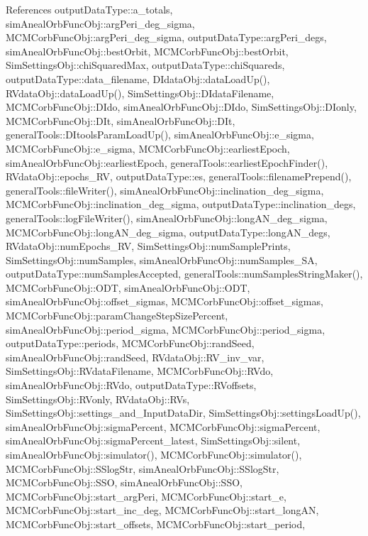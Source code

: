 References output\-Data\-Type\-::a\-\_\-totals, sim\-Aneal\-Orb\-Func\-Obj\-::arg\-Peri\-\_\-deg\-\_\-sigma, M\-C\-M\-Corb\-Func\-Obj\-::arg\-Peri\-\_\-deg\-\_\-sigma, output\-Data\-Type\-::arg\-Peri\-\_\-degs, sim\-Aneal\-Orb\-Func\-Obj\-::best\-Orbit, M\-C\-M\-Corb\-Func\-Obj\-::best\-Orbit, Sim\-Settings\-Obj\-::chi\-Squared\-Max, output\-Data\-Type\-::chi\-Squareds, output\-Data\-Type\-::data\-\_\-filename, D\-Idata\-Obj\-::data\-Load\-Up(), R\-Vdata\-Obj\-::data\-Load\-Up(), Sim\-Settings\-Obj\-::\-D\-Idata\-Filename, M\-C\-M\-Corb\-Func\-Obj\-::\-D\-Ido, sim\-Aneal\-Orb\-Func\-Obj\-::\-D\-Ido, Sim\-Settings\-Obj\-::\-D\-Ionly, M\-C\-M\-Corb\-Func\-Obj\-::\-D\-It, sim\-Aneal\-Orb\-Func\-Obj\-::\-D\-It, general\-Tools\-::\-D\-Itools\-Param\-Load\-Up(), sim\-Aneal\-Orb\-Func\-Obj\-::e\-\_\-sigma, M\-C\-M\-Corb\-Func\-Obj\-::e\-\_\-sigma, M\-C\-M\-Corb\-Func\-Obj\-::earliest\-Epoch, sim\-Aneal\-Orb\-Func\-Obj\-::earliest\-Epoch, general\-Tools\-::earliest\-Epoch\-Finder(), R\-Vdata\-Obj\-::epochs\-\_\-\-R\-V, output\-Data\-Type\-::es, general\-Tools\-::filename\-Prepend(), general\-Tools\-::file\-Writer(), sim\-Aneal\-Orb\-Func\-Obj\-::inclination\-\_\-deg\-\_\-sigma, M\-C\-M\-Corb\-Func\-Obj\-::inclination\-\_\-deg\-\_\-sigma, output\-Data\-Type\-::inclination\-\_\-degs, general\-Tools\-::log\-File\-Writer(), sim\-Aneal\-Orb\-Func\-Obj\-::long\-A\-N\-\_\-deg\-\_\-sigma, M\-C\-M\-Corb\-Func\-Obj\-::long\-A\-N\-\_\-deg\-\_\-sigma, output\-Data\-Type\-::long\-A\-N\-\_\-degs, R\-Vdata\-Obj\-::num\-Epochs\-\_\-\-R\-V, Sim\-Settings\-Obj\-::num\-Sample\-Prints, Sim\-Settings\-Obj\-::num\-Samples, sim\-Aneal\-Orb\-Func\-Obj\-::num\-Samples\-\_\-\-S\-A, output\-Data\-Type\-::num\-Samples\-Accepted, general\-Tools\-::num\-Samples\-String\-Maker(), M\-C\-M\-Corb\-Func\-Obj\-::\-O\-D\-T, sim\-Aneal\-Orb\-Func\-Obj\-::\-O\-D\-T, sim\-Aneal\-Orb\-Func\-Obj\-::offset\-\_\-sigmas, M\-C\-M\-Corb\-Func\-Obj\-::offset\-\_\-sigmas, M\-C\-M\-Corb\-Func\-Obj\-::param\-Change\-Step\-Size\-Percent, sim\-Aneal\-Orb\-Func\-Obj\-::period\-\_\-sigma, M\-C\-M\-Corb\-Func\-Obj\-::period\-\_\-sigma, output\-Data\-Type\-::periods, M\-C\-M\-Corb\-Func\-Obj\-::rand\-Seed, sim\-Aneal\-Orb\-Func\-Obj\-::rand\-Seed, R\-Vdata\-Obj\-::\-R\-V\-\_\-inv\-\_\-var, Sim\-Settings\-Obj\-::\-R\-Vdata\-Filename, M\-C\-M\-Corb\-Func\-Obj\-::\-R\-Vdo, sim\-Aneal\-Orb\-Func\-Obj\-::\-R\-Vdo, output\-Data\-Type\-::\-R\-Voffsets, Sim\-Settings\-Obj\-::\-R\-Vonly, R\-Vdata\-Obj\-::\-R\-Vs, Sim\-Settings\-Obj\-::settings\-\_\-and\-\_\-\-Input\-Data\-Dir, Sim\-Settings\-Obj\-::settings\-Load\-Up(), sim\-Aneal\-Orb\-Func\-Obj\-::sigma\-Percent, M\-C\-M\-Corb\-Func\-Obj\-::sigma\-Percent, sim\-Aneal\-Orb\-Func\-Obj\-::sigma\-Percent\-\_\-latest, Sim\-Settings\-Obj\-::silent, sim\-Aneal\-Orb\-Func\-Obj\-::simulator(), M\-C\-M\-Corb\-Func\-Obj\-::simulator(), M\-C\-M\-Corb\-Func\-Obj\-::\-S\-Slog\-Str, sim\-Aneal\-Orb\-Func\-Obj\-::\-S\-Slog\-Str, M\-C\-M\-Corb\-Func\-Obj\-::\-S\-S\-O, sim\-Aneal\-Orb\-Func\-Obj\-::\-S\-S\-O, M\-C\-M\-Corb\-Func\-Obj\-::start\-\_\-arg\-Peri, M\-C\-M\-Corb\-Func\-Obj\-::start\-\_\-e, M\-C\-M\-Corb\-Func\-Obj\-::start\-\_\-inc\-\_\-deg, M\-C\-M\-Corb\-Func\-Obj\-::start\-\_\-long\-A\-N, M\-C\-M\-Corb\-Func\-Obj\-::start\-\_\-offsets, M\-C\-M\-Corb\-Func\-Obj\-::start\-\_\-period, 
